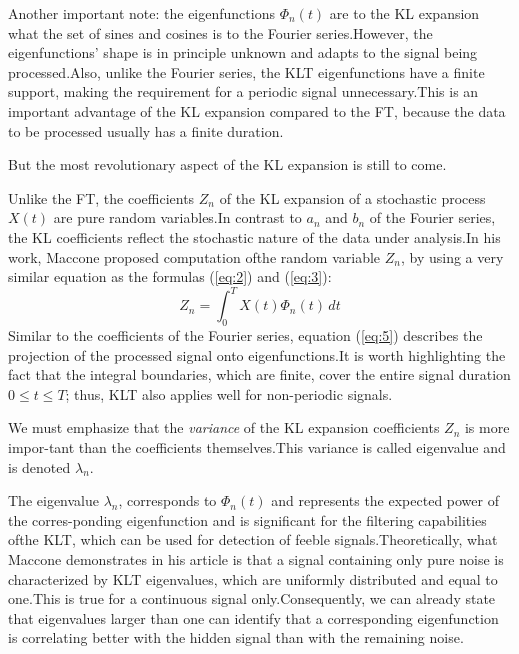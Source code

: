 \documentclass[12pt]{report}
\begin{document}
Another important note: the eigenfunctions $\Phi_n(t)$ are to the KL expansion what the set of sines and cosines is to the
Fourier series.\@ However, the eigenfunctions' shape is in principle unknown and adapts to the signal being processed.\@ Also, unlike the Fourier series, the KLT eigenfunctions have a finite support, making the requirement for a periodic signal unnecessary.\@ This is an important advantage of the KL expansion compared to the FT, because the data to be processed usually has a finite duration.

But the most revolutionary aspect of the KL expansion is still to come.

Unlike the FT, the coefficients $Z_n$ of the KL expansion of a stochastic process $X(t)$ are pure random variables.\@ In contrast to $a_n$ and $b_n$ of the Fourier series, the KL coefficients reflect the stochastic nature of the data under analysis.\@ In his work, Maccone proposed computation ofthe random variable $Z_n$, by using a very similar equation as the formulas (\ref{eq:2}) and (\ref{eq:3}):
\begin{equation}
	Z_n=\int_{0}^{T}X(t)\Phi_n(t)\,dt 
	\label{eq:5}
\end{equation}
Similar to the coefficients of the Fourier series, equation (\ref{eq:5}) describes the projection of the processed signal onto eigenfunctions.\@ It is worth highlighting the fact that the integral boundaries, which are finite, cover the entire signal duration $0{\leq}t{\leq}T$; thus, KLT also applies well for non-periodic signals.

We must emphasize that the \textit{variance} of the KL expansion coefficients $Z_n$ is more impor-tant than the coefficients themselves.\@ This variance is called eigenvalue and is denoted $\lambda_n$.

The eigenvalue $\lambda_n$, corresponds to $\Phi_n(t)$ and represents the expected power of the corres-ponding eigenfunction and is significant for the filtering capabilities ofthe KLT, which can be used for detection of feeble signals.\@ Theoretically, what Maccone demonstrates in his article is that a signal containing only pure noise is characterized by KLT eigenvalues, which are uniformly distributed and equal to one.\@ This is true for a continuous signal only.\@ Consequently, we can already state that eigenvalues larger than one can identify that a corresponding eigenfunction is correlating better with the hidden signal than with the remaining noise.
\end{document}
